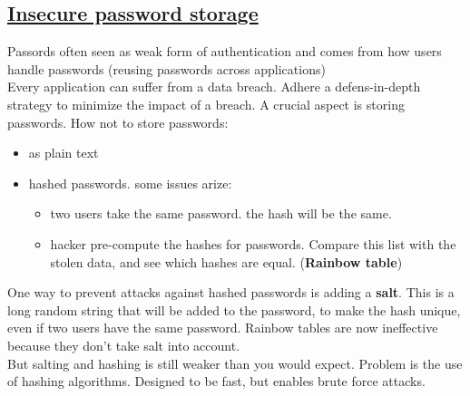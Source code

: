 \documentclass[titlepage]{article}
\begin{document}
    \subsection{\href{https://youtu.be/LUj2x9zTilI}{Insecure password storage}}
    Passords often seen as weak form of authentication and comes from how users handle passwords (reusing passwords across applications)\\
    Every application can suffer from a data breach. Adhere a defens-in-depth strategy to minimize the impact of a breach. A crucial aspect is storing passwords.
    How not to store passwords:
    \begin{itemize}
        \item as plain text
        \item hashed passwords. some issues arize:
        \begin{itemize}
            \item two users take the same password. the hash will be the same.
            \item hacker pre-compute the hashes for passwords. Compare this list with the stolen data, and see which hashes are equal. (\textbf{Rainbow table})
        \end{itemize}
    \end{itemize}
    One way to prevent attacks against hashed passwords is adding a \textbf{salt}. This is a long random string that will be added to the password, to make the hash unique, even if two users have the same password. Rainbow tables are now ineffective because they don't take salt into account.\\
    But salting and hashing is still weaker than you would expect. Problem is the use of hashing algorithms. Designed to be fast, but enables brute force attacks.
\end{document}

